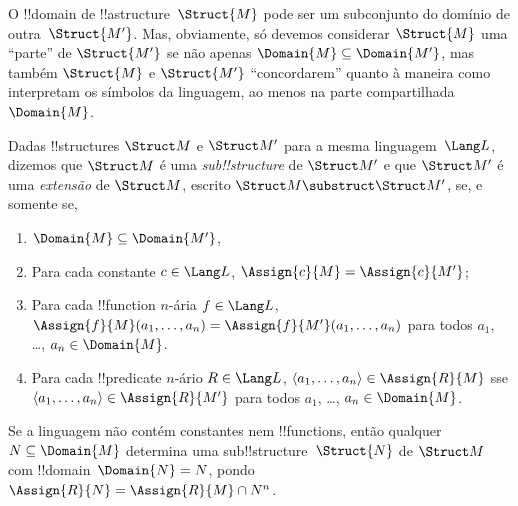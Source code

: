 \documentclass[../../../include/open-logic-section]{subfiles}
\begin{document}

O !!{domain} de !!a{structure}~$\Struct{M}$ pode ser um subconjunto do
domínio de outra~$\Struct{M'}$.  Mas, obviamente, só devemos considerar
$\Struct{M}$ uma ``parte'' de $\Struct{M'}$ se não apenas $\Domain{M}
\subseteq \Domain{M'}$, mas também $\Struct{M}$ e $\Struct{M'}$
``concordarem'' quanto à maneira como interpretam os símbolos da
linguagem, ao menos na parte compartilhada~$\Domain{M}$.

\begin{defn}
Dadas !!{structure}s $\Struct M$ e $\Struct M'$ para a mesma
linguagem~$\Lang L$, dizemos que $\Struct M$ é uma
\emph{sub!!{structure}} de $\Struct M'$ e que $\Struct M'$ é uma
\emph{extensão} de $\Struct M$, escrito $\Struct M \substruct \Struct M'$,
se, e somente se,
\begin{enumerate}
\item $\Domain{M} \subseteq \Domain{M'}$,
\item Para cada constante $c \in \Lang L$, $\Assign{c}{M} =
    \Assign{c}{M'}$;
\item Para cada !!{function} $n$-ária $f \in \Lang L$,
  $\Assign{f}{M}(a_1, \dots, a_n) = \Assign{f}{M'}(a_1, \dots, a_n)$
  para todos $a_1$, \dots, $a_n \in \Domain{M}$.
\item Para cada !!{predicate} $n$-ário $R \in \Lang L$, $\langle
  a_1, \dots, a_n\rangle \in \Assign{R}{M}$ sse $\langle a_1, \dots,
  a_n\rangle \in \Assign{R}{M'}$ para todos $a_1$, \dots, $a_n \in
  \Domain{M}$.
\end{enumerate}
\end{defn}

\begin{rem}
Se a linguagem não contém constantes nem !!{function}s, então qualquer
$N \subseteq \Domain{M}$ determina uma sub!!{structure}~$\Struct{N}$ de
$\Struct M$ com !!{domain}~$\Domain{N} = N$, pondo $\Assign{R}{N} =
\Assign{R}{M} \cap N^n$.
\end{rem}

\end{document}
